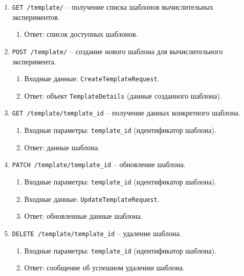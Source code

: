 \begin{enumerate}
\item \texttt{GET /template/} -- получение списка шаблонов вычислительных экспериментов.
\begin{enumerate}[label=\arabic{enumi}.\arabic*.]
\item Ответ: список доступных шаблонов.
\end{enumerate}

\item \texttt{POST /template/} -- создание нового шаблона для вычислительного эксперимента.
\begin{enumerate}[label=\arabic{enumi}.\arabic*.]
\item Входные данные: \texttt{CreateTemplateRequest}.
\item Ответ: объект \texttt{TemplateDetails} (данные созданного шаблона).
\end{enumerate}

\item \texttt{GET /template/{template\_id}} -- получение данных конкретного шаблона.
\begin{enumerate}[label=\arabic{enumi}.\arabic*.]
\item Входные параметры: \texttt{template\_id} (идентификатор шаблона).
\item Ответ: данные шаблона.
\end{enumerate}

\item \texttt{PATCH /template/{template\_id}} -- обновление шаблона.
\begin{enumerate}[label=\arabic{enumi}.\arabic*.]
\item Входные параметры: \texttt{template\_id} (идентификатор шаблона).
\item Входные данные: \texttt{UpdateTemplateRequest}.
\item Ответ: обновленные данные шаблона.
\end{enumerate}

\item \texttt{DELETE /template/{template\_id}} -- удаление шаблона.
\begin{enumerate}[label=\arabic{enumi}.\arabic*.]
\item Входные параметры: \texttt{template\_id} (идентификатор шаблона).
\item Ответ: сообщение об успешном удалении шаблона.
\end{enumerate}
\end{enumerate}

